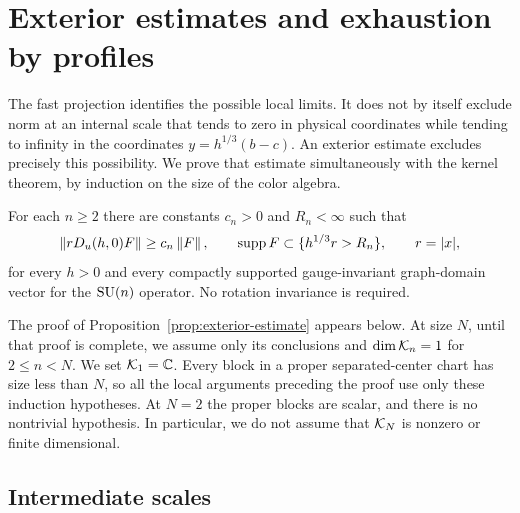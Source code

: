 \section{Exterior estimates and exhaustion by profiles}
\label{sec:profiles}

The fast projection identifies the possible local limits. It does not by
itself exclude norm at an internal scale that tends to zero in physical
coordinates while tending to infinity in the coordinates
\(y=h^{1/3}(b-c)\). An exterior estimate excludes precisely this possibility.
We prove that estimate simultaneously with the kernel theorem, by induction
on the size of the color algebra.

\begin{proposition}\label{prop:exterior-estimate}
For each \(n\ge2\) there are constants \(c_n>0\) and \(R_n<\infty\) such that
\begin{equation}\label{eq:exterior-estimate}
 \left\lVert rD_u(h,0)F\right\rVert\ge c_n\left\lVert F\right\rVert,
 \qquad
 \operatorname{supp} F\subset\{h^{1/3}r>R_n\},
 \qquad r=|x|,
\end{equation}
for every \(h>0\) and every compactly supported gauge-invariant graph-domain
vector for the \(\operatorname{SU}(n)\) operator. No rotation invariance is required.
\end{proposition}

The proof of Proposition~\ref{prop:exterior-estimate} appears below. At size
\(N\), until that proof is complete, we assume only its conclusions and
\(\dim\mathcal K_n=1\) for \(2\le n<N\). We set \(\mathcal K_1=\mathbb C\). Every block in a
proper separated-center chart has size less than \(N\), so all the local
arguments preceding the proof use only these induction hypotheses. At
\(N=2\) the proper blocks are scalar, and there is no nontrivial hypothesis.
In particular, we do not assume that \(\mathcal K_N\) is nonzero or finite
dimensional.

\subsection{Intermediate scales}

